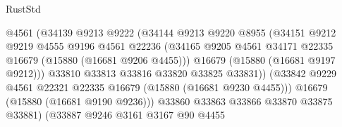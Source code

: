 \begin{lexlean}{RustStd}
\begin{coremodule}
                                        @4561
                                        (@34139
                                          @9213
                                          @9222
                                          (@34144
                                            @9213
                                            @9220
                                            @8955
                                            (@34151
                                              @9212
                                              @9219
                                              @4555
                                              @9196
                                              @4561
                                              @22236
                                              (@34165
                                                @9205
                                                @4561
                                                @34171
                                                @22335
                                                @16679
                                                (@15880 (@16681 @9206 @4455)))
                                              @16679
                                              (@15880 (@16681 @9197 @9212)))
                                            @33810
                                            @33813
                                            @33816
                                            @33820
                                            @33825
                                            @33831))
                                        (@33842
                                          @9229
                                          @4561
                                          @22321
                                          @22335
                                          @16679
                                          (@15880 (@16681 @9230 @4455)))
                                        @16679
                                        (@15880 (@16681 @9190 @9236)))
                                      @33860
                                      @33863
                                      @33866
                                      @33870
                                      @33875
                                      @33881)
                                    (@33887
                                      @9246
                                      @3161
                                      @3167
                                      @90
                                      @4455

\end{coremodule}
\end{lexlean}
